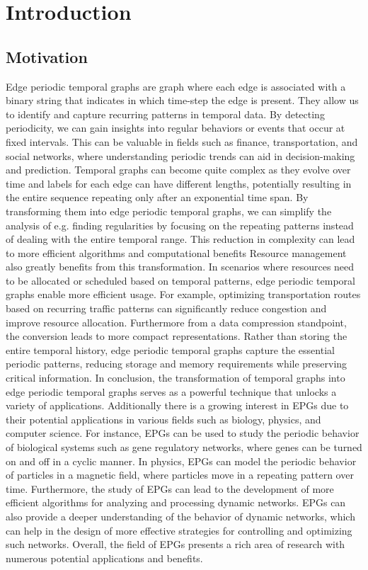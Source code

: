 \chapter{Introduction}
\label{ch:Introduction}
\section{Motivation}
\label{ch:Introduction:sec:Motivation}
Edge periodic temporal graphs are graph where each edge is associated with a binary string that indicates in which time-step the edge is present. They allow us to identify and capture recurring patterns in temporal data. By detecting periodicity, we can gain insights into regular behaviors or events that occur at fixed intervals. This can be valuable in fields such as finance, transportation, and social networks, where understanding periodic trends can aid in decision-making and prediction. Temporal graphs can become quite complex as they evolve over time and labels for each edge can have different lengths, potentially resulting in the entire sequence repeating only after an exponential time span. By transforming them into edge periodic temporal graphs, we can simplify the analysis of e.g. finding regularities by focusing on the repeating patterns instead of dealing with the entire temporal range. This reduction in complexity can lead to more efficient algorithms and computational benefits Resource management also greatly benefits from this transformation. In scenarios where resources need to be allocated or scheduled based on temporal patterns, edge periodic temporal graphs enable more efficient usage. For example, optimizing transportation routes based on recurring traffic patterns can significantly reduce congestion and improve resource allocation. Furthermore from a data compression standpoint, the conversion leads to more compact representations. Rather than storing the entire temporal history, edge periodic temporal graphs capture the essential periodic patterns, reducing storage and memory requirements while preserving critical information. In conclusion, the transformation of temporal graphs into edge periodic temporal graphs serves as a powerful technique that unlocks a variety of applications. Additionally there is a growing interest in EPGs due to their potential applications in various fields such as biology, physics, and computer science. For instance, EPGs can be used to study the periodic behavior of biological systems such as gene regulatory networks, where genes can be turned on and off in a cyclic manner. In physics, EPGs can model the periodic behavior of particles in a magnetic field, where particles move in a repeating pattern over time. Furthermore, the study of EPGs can lead to the development of more efficient algorithms for analyzing and processing dynamic networks. EPGs can also provide a deeper understanding of the behavior of dynamic networks, which can help in the design of more effective strategies for controlling and optimizing such networks. Overall, the field of EPGs presents a rich area of research with numerous potential applications and benefits.

